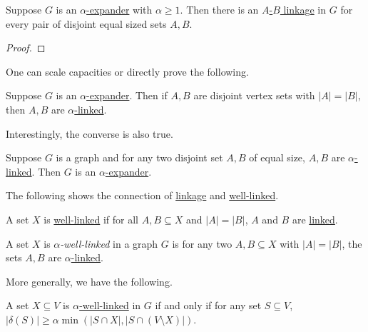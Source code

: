 \begin{lemma}\label{lma:expander-linkage}
	Suppose \(G\) is an \hyperref[def:expander]{\(\alpha \)-expander} with \(\alpha \geq 1\). Then there is an \hyperref[def:linkage]{\(A\)-\(B\) linkage} in \(G\) for every pair of disjoint equal sized sets \(A, B\).
\end{lemma}
\begin{proof}

\end{proof}

One can scale capacities or directly prove the following.

\begin{corollary}
	Suppose \(G\) is an \hyperref[def:expander]{\(\alpha \)-expander}. Then if \(A, B\) are disjoint vertex sets with \(\lvert A \rvert = \lvert B \rvert \), then \(A, B\) are \hyperref[def:fractional-linkage]{\(\alpha \)-linked}.
\end{corollary}

Interestingly, the converse is also true.

\begin{lemma}\label{lma:linkage-expander}
	Suppose \(G\) is a graph and for any two disjoint set \(A, B\) of equal size, \(A, B\) are \hyperref[def:fractional-linkage]{\(\alpha \)-linked}. Then \(G\) is an \hyperref[def:expander]{\(\alpha \)-expander}.
\end{lemma}

The following shows the connection of \hyperref[def:linkage]{linkage} and \hyperref[def:well-linked]{well-linked}.

\begin{claim}
	A set \(X\) is \hyperref[def:well-linked]{well-linked} if for all \(A, B \subseteq X\) and \(\lvert A \rvert = \lvert B \rvert \), \(A\) and \(B\) are \hyperref[def:linkage]{linked}.
\end{claim}

\begin{definition}\label{def:fractional-well-linked}
	A set \(X\) is \emph{\(\alpha \)-well-linked} in a graph \(G\) is for any two \(A, B \subseteq X\) with \(\lvert A \rvert = \lvert B \rvert \), the sets \(A, B\) are \hyperref[def:fractional-linkage]{\(\alpha \)-linked}.
\end{definition}

More generally, we have the following.

\begin{lemma}
	A set \(X \subseteq V\) is \hyperref[def:fractional-well-linked]{\(\alpha \)-well-linked} in \(G\) if and only if for any set \(S \subseteq V\), \(\lvert \delta (S) \rvert \geq \alpha \min (\lvert S \cap X \rvert , \lvert S \cap (V\setminus X) \rvert )\).
\end{lemma}

